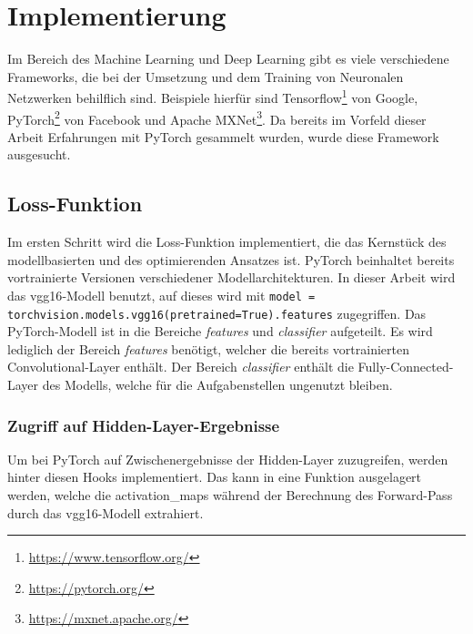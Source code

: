 \chapter{Implementierung}
\label{cha:implementation}

Im Bereich des Machine Learning und Deep Learning gibt es viele verschiedene Frameworks, die bei der Umsetzung und dem Training von Neuronalen Netzwerken behilflich sind. Beispiele hierfür sind Tensorflow\footnote{\url{https://www.tensorflow.org/}} von Google, PyTorch\footnote{\url{https://pytorch.org/}} von Facebook und Apache MXNet\footnote{\url{https://mxnet.apache.org/}}. Da bereits im Vorfeld dieser Arbeit Erfahrungen mit PyTorch gesammelt wurden, wurde diese Framework ausgesucht.

\section{Loss-Funktion}

Im ersten Schritt wird die Loss-Funktion implementiert, die das Kernstück des modellbasierten und des optimierenden Ansatzes ist.
PyTorch beinhaltet bereits vortrainierte Versionen verschiedener Modellarchitekturen. In dieser Arbeit wird das \gls{vgg16}-Modell benutzt, auf dieses wird mit \texttt{model = torchvision.models.vgg16(pretrained=True).features} zugegriffen. Das PyTorch-Modell ist in die Bereiche \textit{features} und \textit{classifier} aufgeteilt. Es wird lediglich der Bereich \textit{features} benötigt, welcher die bereits vortrainierten Convolutional-Layer enthält. Der Bereich \textit{classifier} enthält die Fully-Connected-Layer des Modells, welche für die Aufgabenstellen ungenutzt bleiben.

\pagebreak

\subsection{Zugriff auf Hidden-Layer-Ergebnisse}

Um bei PyTorch auf Zwischenergebnisse der Hidden-Layer zuzugreifen, werden hinter diesen Hooks implementiert. Das kann in eine Funktion ausgelagert werden, welche die \gls{activation_map}s während der Berechnung des Forward-Pass durch das \gls{vgg16}-Modell extrahiert.

